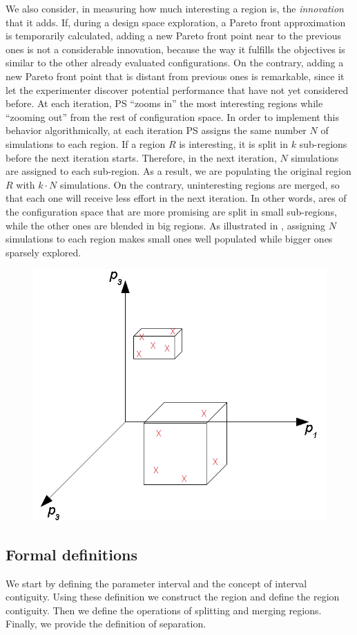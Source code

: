 We also consider, in measuring how much interesting a region is, the
\emph{innovation} that it adds. If, during a design space exploration,
a Pareto front approximation is temporarily calculated, adding a new Pareto front
point near to the previous ones is not a considerable innovation,
because the way it fulfills the objectives is similar to the other
already evaluated configurations. On the contrary, adding a new Pareto
front point that is distant from previous ones is remarkable,
since it let the experimenter discover potential performance that have not yet considered before.
At each iteration, PS ``zooms in'' the most interesting regions while ``zooming out'' from the rest of configuration space. In order to implement this behavior algorithmically, at each iteration PS assigns the same number $N$ of simulations to each region. If a region $R$ is interesting, it is split in $k$ sub-regions before the next iteration starts. Therefore, in the next iteration, $N$ simulations are assigned to each sub-region. As a result, we are populating the original region $R$ with $k\cdot N$ simulations. On the contrary, uninteresting regions are merged, so that each one will receive less effort in the next iteration. In other words, ares of the configuration space that are more promising are split in small sub-regions, while the other ones are blended in big regions. As illustrated in , assigning $N$ simulations to each region makes small ones well populated while bigger ones sparsely explored.


	\begin{figure}[t]
	\center
	\includegraphics[width=0.5\columnwidth]{img/small_and_big}
	\end{figure}


\subsection{Formal definitions}
We start by defining the parameter interval and the concept of interval contiguity. Using these definition we construct the region and define the region contiguity. Then we define the operations of splitting and merging regions. Finally, we provide the definition of separation.

